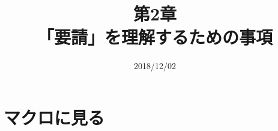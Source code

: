 \documentclass{jsarticle}
\begin{document}
\title{第2章\\「要請」を理解するための事項}
\date{2018/12/02}
\maketitle
\section{マクロに見る}
\end{document}
